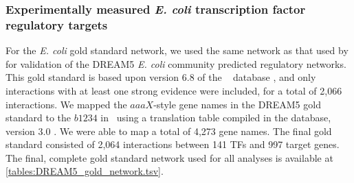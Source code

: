 \subsubsection{Experimentally measured {\it E. coli} transcription factor regulatory targets}
\label{section:eco:gold:standard}

For the {\it E. coli} gold standard network, we used the same network
as that used by \cite{Marbach2012} for validation of the DREAM5 {\it
E. coli} community predicted regulatory networks. This gold standard
is based upon version 6.8 of the \rdb~
database \cite{Gama-Castro2011}, and only interactions with at least
one strong evidence were included, for a total of 2,066 interactions.
We mapped the $aaaX$-style gene names in the DREAM5 gold standard to
the $b1234$ in \cm~using a translation table compiled in the
{} database, version 3.0 \cite{Zhou2013a}. We were
able to map a total of 4,273 gene names. The final gold standard
consisted of 2,064 interactions between 141 TFs and 997 target
genes. The final, complete gold standard network used for all analyses
is available at \ref{tables:DREAM5_gold_network.tsv}.
